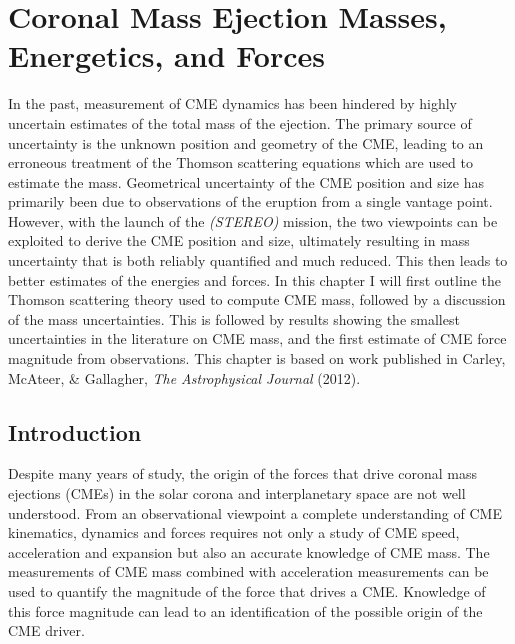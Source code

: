 
\singlespacing
\chapter{Coronal Mass Ejection Masses, Energetics, and Forces} 
\label{chap:4}
\vspace{-10mm}
\doublespacing
In the past, measurement of CME dynamics has been hindered by highly uncertain estimates of the total mass of the ejection. The primary source of uncertainty is the unknown position and geometry of the CME, leading to an erroneous treatment of the Thomson scattering equations which are used to estimate the mass. Geometrical uncertainty of the CME position and size has primarily been due to observations of the eruption from a single vantage point. However, with the launch of the {\it(STEREO)} mission, the two viewpoints can be exploited to derive the CME position and size, ultimately resulting in mass uncertainty that is both reliably quantified and much reduced. This then leads to better estimates of the energies and forces. In this chapter I will first outline the Thomson scattering theory used to compute CME mass, followed by a discussion of the mass uncertainties. This is followed by results showing the smallest uncertainties in the literature on CME mass, and the first estimate of CME force magnitude from observations. This chapter is based on work published in Carley, McAteer, \& Gallagher, {\it The Astrophysical Journal} (2012).

\section{Introduction}\label{sec:1}

Despite many years of study, the origin of the forces that drive coronal mass ejections (CMEs) in the solar corona and interplanetary space are not well understood. From an observational viewpoint a complete understanding of CME kinematics, dynamics and forces requires not only a study of CME speed, acceleration and expansion but also an accurate knowledge of CME mass.  The measurements of CME mass combined with acceleration measurements can be used to quantify the magnitude of the force that drives a CME. Knowledge of this force magnitude can lead to an identification of the possible origin of the CME driver. 

